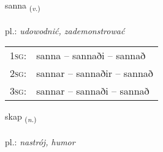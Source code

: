 \documentclass[frontgrid, backgrid]{flacards}\usepackage[]{graphicx}\usepackage[]{xcolor}
\begin{document}
\renewcommand{\flhead}{\vskip5pt \fboxsep=0pt {\small\bfseries\footnotesize Sagnorð | Verb}}
\renewcommand{\fcfoot}{\vskip5pt \fboxsep=0pt \hspace{2pt}{\small\bfseries\footnotesize 2K}}

\renewcommand{\blhead}{\vskip5pt {\small\bfseries\footnotesize Sagnorð | Verb }}
\renewcommand{\bcfoot}{\vskip5pt \hspace{2pt}{\small\bfseries\footnotesize 2K}}


{sanna \small{\textsubscript{(\textit{v.})}} \\[1ex] %
\textphonetic{[sana]} \\
pl.: \emph{udowodnić, zademonstrować} \\  [2ex]
\renewcommand*{\arraystretch}{0.8}
\begin{tabular}{p{1cm}l}
\textsc{1sg}: & sanna -- sannaði -- sannað \\ 
\textsc{2sg}: & sannar -- sannaðir -- sannað \\ 
\textsc{3sg}: & sannar -- sannaði -- sannað \\ 
\end{tabular}
}

\renewcommand{\flhead}{\vskip5pt \fboxsep=0pt {\small\bfseries\footnotesize Nafnorð | Noun}}
\renewcommand{\fcfoot}{\vskip5pt \fboxsep=0pt \hspace{2pt}{\small\bfseries\footnotesize 2K}}

\renewcommand{\blhead}{\vskip5pt {\small\bfseries\footnotesize Nafnorð | Noun }}
\renewcommand{\bcfoot}{\vskip5pt \hspace{2pt}{\small\bfseries\footnotesize 2K}}


{skap \small{\textsubscript{(\textit{n.})}} \\[1ex] %
\textphonetic{[skaːp]} \\
pl.: \emph{nastrój, humor} \\  [2ex]
\renewcommand*{\arraystretch}{0.8}
}
\end{document}
